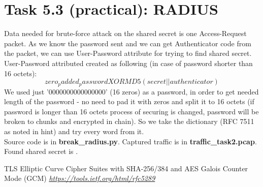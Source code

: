 \documentclass{article}
\begin{document}
\section*{Task 5.3 (practical): RADIUS}
Data needed for brute-force attack on the shared secret is one Access-Request packet. As we know the password sent and we can get Authenticator code from the packet, we can use User-Password attribute for trying to find shared secret. User-Password attributed created as following (in case of password shorter than 16 octets): 
$$zero_padded_password XOR MD5(secret || authenticator)$$
We used just '0000000000000000' (16 zeros) as a password, in order to get needed length of the password - no need to pad it with zeros and split it to 16 octets (if password is longer than 16 octets process of securing is changed, password will be broken to chunks and encrypted in chain). So we take the dictionary (RFC 7511 as noted in hint) and try every word from it.
\\
Source code is in \textbf{break_radius.py}. Captured traffic is in \textbf{traffic_task2.pcap}. Found shared secret is \textbf{}.

\cite{tls-ref}

\begin{thebibliography}{9}

  TLS Elliptic Curve Cipher Suites with SHA-256/384 and AES Galois Counter Mode (GCM)
  \emph{\url{https://tools.ietf.org/html/rfc5289}}
    
\end{thebibliography}
\end{document}
